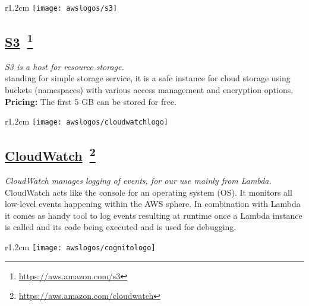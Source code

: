 \begin{wrapfigure}[2]{r}{1.2cm}
	\texttt{[image: awslogos/s3]}
\end{wrapfigure}

%

\subsection*{
\href{https://aws.amazon.com/s3/}{\textbf{S3}}~\footnote{\url{https://aws.amazon.com/s3}}
}
\textit{S3 is a host for resource storage.}\\
standing for simple storage service, it is a safe instance for cloud storage using buckets (namespaces) with various access management and encryption options. \\ \textbf{Pricing:} The first 5 GB can be stored for free.



\begin{wrapfigure}[2]{r}{1.2cm}
	\texttt{[image: awslogos/cloudwatchlogo]}
\end{wrapfigure}

%

	
	\subsection*{
		\href{https://aws.amazon.com/iam/}{\textbf{CloudWatch}}~\footnote{\url{https://aws.amazon.com/cloudwatch}}
	}
	\textit{CloudWatch manages logging of events, for our use mainly from Lambda.}\\
	CloudWatch acts like the console for an operating system (OS). It monitors all low-level events happening within the AWS sphere. In combination with Lambda it comes as handy tool to log events resulting at runtime once a Lambda instance is called and its code being executed and is used for debugging.
	
	
\begin{wrapfigure}[2]{r}{1.2cm}
	\texttt{[image: awslogos/cognitologo]}
\end{wrapfigure}


